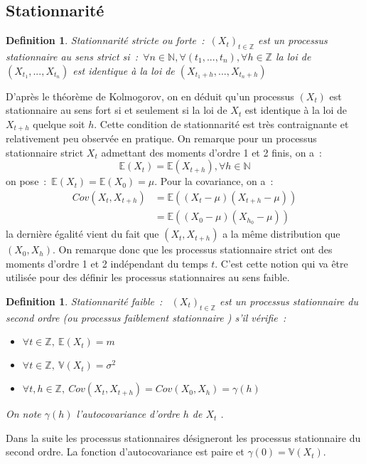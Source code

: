 \documentclass[11pt]{scrartcl} %
\newtheorem{Def}[theorem]{Definition}
\newcommand{\var}[1]{\mathbb{V}\left(#1\right)}
\begin{document}
\subsection{Stationnarité}
\begin{Def}
Stationnarité stricte ou forte~:~$\left(X_t\right)_{t\in\mathbb{Z}}$ est un processus stationnaire au sens strict si~:~$\forall n\in \mathbb{N}, \forall (t_1,...,t_n), \forall h\in\mathbb{Z}$ la loi de $(X_{t_1},...,X_{t_n})$ est identique à la loi de $(X_{t_1+h},...,X_{t_n+h})$
\end{Def}
D'après le théorème de Kolmogorov, on en déduit qu'un processus $\left(X_t\right)$ est stationnaire au sens fort si et seulement si la loi de $X_t$ est identique à la loi de $X_{t+h}$ quelque soit $h$. Cette condition de stationnarité est très contraignante et relativement peu observée en pratique. On remarque pour un processus stationnaire strict $X_t$ admettant des moments d'ordre 1 et 2 finis, on a~:
$$
\mathbb{E}\left(X_t\right)=\mathbb{E}\left(X_{t+h}\right), \forall h\in \mathbb{N}
$$
on pose~:~$\mathbb{E}\left(X_t\right)=\mathbb{E}\left(X_0\right)=\mu$. Pour la covariance, on a~:
\begin{align*}
Cov\left(X_t,X_{t+h}\right)& = \mathbb{E}\left((X_t-\mu)(X_{t+h}-\mu)\right)\\
&= \mathbb{E}\left((X_0-\mu)(X_{h_0}-\mu)\right)
\end{align*}
la dernière égalité vient du fait que $(X_t,X_{t+h})$ a la même distribution que $(X_0,X_h)$.
On remarque donc que les processus stationnaire strict ont des moments d'ordre 1 et 2 indépendant du temps $t$. C'est cette notion qui va être utilisée pour des définir les processus stationnaires au sens faible.
\begin{Def}
Stationnarité faible~:~
$\left(X_t\right)_{t\in\mathbb{Z}}$ est un processus stationnaire du second ordre (ou processus faiblement stationnaire ) s'il vérifie~:
\begin{itemize}
\item[i)]$\forall t\in\mathbb{Z},~\mathbb{E}\left(X_t\right)=m $ 
\item[ii)]$\forall t\in\mathbb{Z},~\mathbb{V}\left(X_t\right)=\sigma^2 $ 
\item[iii)]$\forall t,h\in\mathbb{Z},~Cov\left(X_t,X_{t+h}\right)=Cov\left(X_0,X_h\right)=\gamma\left(h\right) $ 
\end{itemize}
On note $\gamma(h)$ l'autocovariance d'ordre $h$ de $X_t$ .
\end{Def} 
Dans la suite les processus stationnaires désigneront les processus stationnaire du second ordre. La fonction d'autocovariance est paire et $\gamma(0)=\var{X_t}$.
\end{document}
